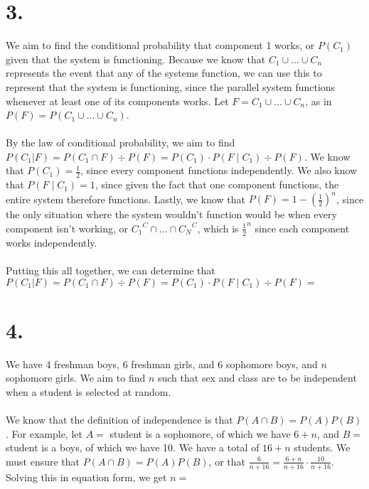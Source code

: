 \documentclass{article}
\begin{document}
\section*{3.}
{\Large 

We aim to find the conditional probability that component 1 works, or $P(C_1)$ given that the system is functioning. Because we know that $C_1 \cup \dots \cup C_n$ represents the event that any of the systems function, we can use this to represent that the system is functioning, since the parallel system functions whenever at least one of its components works. Let $F = C_1 \cup \dots \cup C_n$, as in $P(F) = P(C_1 \cup \dots \cup C_n)$. \\ \\ 
By the law of conditional probability, we aim to find $P(C_1 | F) = P(C_1 \cap F) \div P(F) = P(C_1) \cdot P(F \mid C_1) \div P(F)$. We know that $P(C_1) = \frac{1}{2}$, since every component functions independently. We also know that $P(F \mid C_1) = 1$, since given the fact that one component functions, the entire system therefore functions. Lastly, we know that $P(F) = 1 - (\frac{1}{2})^n$, since the only situation where the system wouldn't function would be when every component isn't working, or ${C_1}^C \cap \dots \cap {C_N}^C$, which is $\frac{1}{2}^n$ since each component works independently. \\ \\
Putting this all together, we can determine that $P(C_1 | F) = P(C_1 \cap F) \div P(F) = P(C_1) \cdot P(F \mid C_1) \div P(F) = $ 

}

\section*{4.}
{\Large 

We have 4 freshman boys, 6 freshman girls, and 6 sophomore boys, and $n$ sophomore girls. We aim to find $n$ such that sex and class are to be independent when a student is selected at random. \\ \\
We know that the definition of independence is that $P(A \cap B) = P(A)P(B)$. For example, let $A = $ student is a sophomore, of which we have $6 + n$, and $B = $ student is a boys, of which we have 10. We have a total of $16 + n$ students. We must ensure that $P(A \cap B) = P(A)P(B)$, or that $\frac{6}{n + 16} = \frac{6 + n}{n + 16} \cdot \frac{10}{n + 16}$. Solving this in equation form, we get $n = $ 


}
\end{document}
